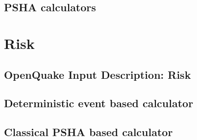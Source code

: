 \documentclass[12pt,a4paper,headings=small,version=first,dvips]{scrbook}
\begin{document}
\chapter{PSHA calculators}
	
%	
%	
\part{Risk}
\chapter{OpenQuake Input Description: Risk}
	
\chapter{Deterministic event based calculator}
	
\chapter{Classical PSHA based calculator}
	
\end{document}
